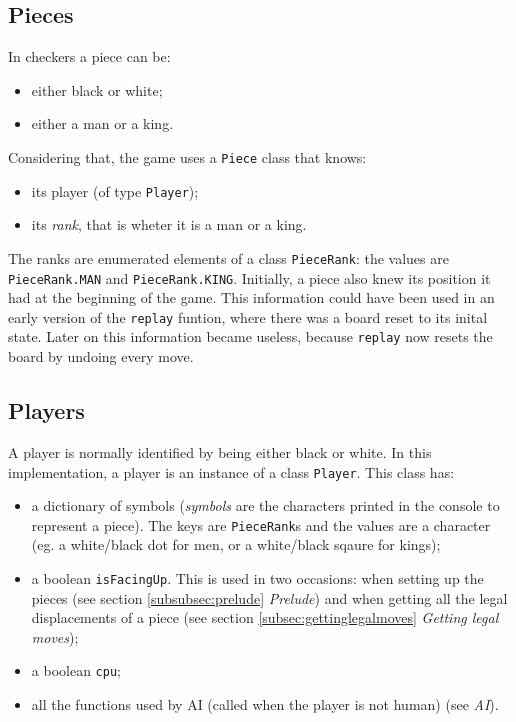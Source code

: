 \documentclass[10pt, a4paper]{article}
\begin{document}
    \subsection{Pieces}
    In checkers a piece can be:
    \begin{itemize}
    	\item either black or white;
    	\item either a man or a king.
    \end{itemize}
	Considering that, the game uses a \texttt{Piece} class that knows:
	\begin{itemize}
		\item its player (of type \texttt{Player});
		\item its \textit{rank}, that is wheter it is a man or a king.
	\end{itemize}
	The ranks are enumerated elements of a class \texttt{PieceRank}: the values are \texttt{PieceRank.MAN} and \texttt{PieceRank.KING}.
	Initially, a piece also knew its position it had at the beginning of the game. This information could have been used in an early version of the \texttt{replay} funtion, where there was a board reset to its inital state. Later on this information became useless, because \texttt{replay} now resets the board by undoing every move.
	
	\subsection{Players}
	A player is normally identified by being either black or white. In this implementation, a player is an instance of a class \texttt{Player}. This class has:
	\begin{itemize}
		\item a dictionary of symbols (\textit{symbols} are the characters printed in the console to represent a piece). The keys are \texttt{PieceRank}s and the values are a character (eg. a white/black dot for men, or a white/black sqaure for kings);
		\item a boolean \texttt{isFacingUp}. This is used in two occasions: when setting up the pieces (see section \ref{subsubsec:prelude} \textit{Prelude}) and when getting all the legal displacements of a piece (see section \ref{subsec:gettinglegalmoves} \textit{Getting legal moves});
		\item a boolean \texttt{cpu};
		\item all the functions used by AI (called when the player is not human) (see \textit{AI}).
	\end{itemize}
\end{document}
